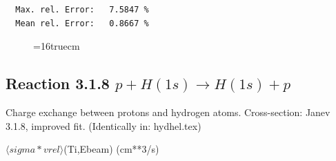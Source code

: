 \documentclass[12pt,dvips]{article}
\begin{document}
\begin{small}
\begin{verbatim}
  Max. rel. Error:   7.5847 %
  Mean rel. Error:   0.8667 %

\end{verbatim}\end{small}


\begin{figure} \label{2.3.9H3}
\epsfxsize=16truecm
\end{figure}
\newpage
\subsection{
Reaction 3.1.8  $ p + H(1s) \rightarrow H(1s) + p   $
}

 Charge exchange between protons and hydrogen
 atoms. Cross-section: Janev  3.1.8, improved fit. (Identically in: hydhel.tex)

$  \langle sigma*vrel \rangle$(Ti,Ebeam)  (cm**3/s)
\end{document}
